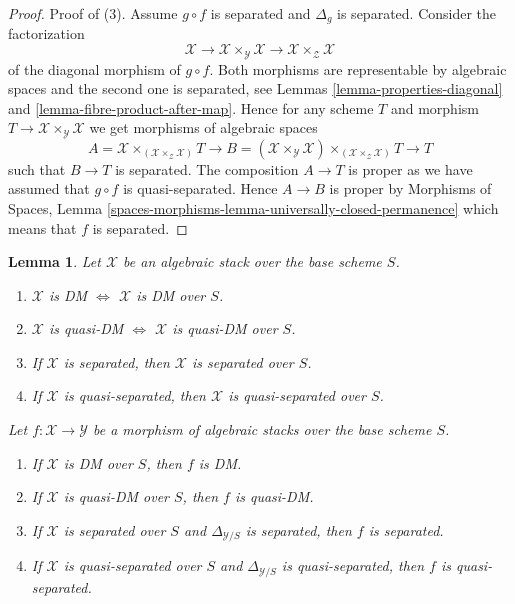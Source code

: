 \documentclass{stacks-project}
\theoremstyle{plain}
\newtheorem{lemma}[subsection]{Lemma}
\theoremstyle{definition}
\theoremstyle{remark}
\numberwithin{equation}{subsection}
\begin{document}
\begin{proof}
\medskip\noindent
Proof of (3). Assume $g \circ f$ is separated and $\Delta_g$ is
separated. Consider the factorization
$$
\mathcal{X} \to
\mathcal{X} \times_\mathcal{Y} \mathcal{X} \to
\mathcal{X} \times_\mathcal{Z} \mathcal{X}
$$
of the diagonal morphism of $g \circ f$. Both morphisms are
representable by algebraic spaces and the second one is separated, see
Lemmas \ref{lemma-properties-diagonal} and
\ref{lemma-fibre-product-after-map}.
Hence for any scheme $T$ and morphism
$T \to \mathcal{X} \times_\mathcal{Y} \mathcal{X}$
we get morphisms of algebraic spaces
$$
A = \mathcal{X} \times_{(\mathcal{X} \times_\mathcal{Z} \mathcal{X})} T
\longrightarrow
B = (\mathcal{X} \times_\mathcal{Y} \mathcal{X})
\times_{(\mathcal{X} \times_\mathcal{Z} \mathcal{X})} T
\longrightarrow
T
$$
such that $B \to T$ is separated.
The composition $A \to T$ is proper as we have assumed that
$g \circ f$ is quasi-separated. Hence $A \to B$ is proper by
Morphisms of Spaces,
Lemma \ref{spaces-morphisms-lemma-universally-closed-permanence}
which means that $f$ is separated.
\end{proof}

\begin{lemma}
\label{lemma-separated-implies-morphism-separated}
Let $\mathcal{X}$ be an algebraic stack over the base scheme $S$.
\begin{enumerate}
\item
$\mathcal{X}$ is DM $\Leftrightarrow$
$\mathcal{X}$ is DM over $S$.
\item
$\mathcal{X}$ is quasi-DM $\Leftrightarrow$
$\mathcal{X}$ is quasi-DM over $S$.
\item If $\mathcal{X}$ is separated, then
$\mathcal{X}$ is separated over $S$.
\item If $\mathcal{X}$ is quasi-separated, then
$\mathcal{X}$ is quasi-separated over $S$.
\end{enumerate}
Let $f : \mathcal{X} \to \mathcal{Y}$ be a morphism of algebraic stacks
over the base scheme $S$.
\begin{enumerate}
\item[(5)] If $\mathcal{X}$ is DM over $S$, then $f$ is DM.
\item[(6)] If $\mathcal{X}$ is quasi-DM over $S$, then $f$ is quasi-DM.
\item[(7)] If $\mathcal{X}$ is separated over $S$ and
$\Delta_{\mathcal{Y}/S}$ is separated, then $f$ is separated.
\item[(8)] If $\mathcal{X}$ is quasi-separated over $S$ and
$\Delta_{\mathcal{Y}/S}$ is quasi-separated, then $f$ is quasi-separated.
\end{enumerate}
\end{lemma}
\end{document}
